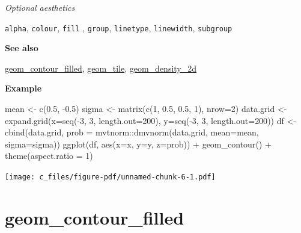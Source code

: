 \documentclass[
  letterpaper,
  DIV=11,
  numbers=noendperiod]{scrreprt}
\newenvironment{Shaded}{\begin{snugshade}}{\end{snugshade}}
\newcommand{\AttributeTok}[1]{\textcolor[rgb]{0.40,0.45,0.13}{#1}}
\newcommand{\DecValTok}[1]{\textcolor[rgb]{0.68,0.00,0.00}{#1}}
\newcommand{\FloatTok}[1]{\textcolor[rgb]{0.68,0.00,0.00}{#1}}
\newcommand{\FunctionTok}[1]{\textcolor[rgb]{0.28,0.35,0.67}{#1}}
\newcommand{\NormalTok}[1]{\textcolor[rgb]{0.00,0.23,0.31}{#1}}
\newcommand{\OtherTok}[1]{\textcolor[rgb]{0.00,0.23,0.31}{#1}}
\newcommand{\SpecialCharTok}[1]{\textcolor[rgb]{0.37,0.37,0.37}{#1}}
\begin{document}
\emph{Optional aesthetics}

\texttt{alpha}, \texttt{colour}, \texttt{fill} , \texttt{group},
\texttt{linetype}, \texttt{linewidth}, \texttt{subgroup}

\textbf{See also}

\hyperref[contour_filled]{geom\_contour\_filled},
\hyperref[tile]{geom\_tile}, \hyperref[density_2d]{geom\_density\_2d}

\textbf{Example}

\begin{Shaded}
\begin{Highlighting}[]
\NormalTok{mean }\OtherTok{\textless{}{-}} \FunctionTok{c}\NormalTok{(}\FloatTok{0.5}\NormalTok{, }\SpecialCharTok{{-}}\FloatTok{0.5}\NormalTok{)}
\NormalTok{sigma }\OtherTok{\textless{}{-}} \FunctionTok{matrix}\NormalTok{(}\FunctionTok{c}\NormalTok{(}\DecValTok{1}\NormalTok{, }\FloatTok{0.5}\NormalTok{, }\FloatTok{0.5}\NormalTok{, }\DecValTok{1}\NormalTok{), }\AttributeTok{nrow=}\DecValTok{2}\NormalTok{)}
\NormalTok{data.grid }\OtherTok{\textless{}{-}} \FunctionTok{expand.grid}\NormalTok{(}\AttributeTok{x=}\FunctionTok{seq}\NormalTok{(}\SpecialCharTok{{-}}\DecValTok{3}\NormalTok{, }\DecValTok{3}\NormalTok{, }\AttributeTok{length.out=}\DecValTok{200}\NormalTok{),}
                         \AttributeTok{y=}\FunctionTok{seq}\NormalTok{(}\SpecialCharTok{{-}}\DecValTok{3}\NormalTok{, }\DecValTok{3}\NormalTok{, }\AttributeTok{length.out=}\DecValTok{200}\NormalTok{))}
\NormalTok{df }\OtherTok{\textless{}{-}} \FunctionTok{cbind}\NormalTok{(data.grid, }\AttributeTok{prob =}\NormalTok{ mvtnorm}\SpecialCharTok{::}\FunctionTok{dmvnorm}\NormalTok{(data.grid, }\AttributeTok{mean=}\NormalTok{mean, }\AttributeTok{sigma=}\NormalTok{sigma))}
\FunctionTok{ggplot}\NormalTok{(df, }\FunctionTok{aes}\NormalTok{(}\AttributeTok{x=}\NormalTok{x, }\AttributeTok{y=}\NormalTok{y, }\AttributeTok{z=}\NormalTok{prob)) }\SpecialCharTok{+} 
  \FunctionTok{geom\_contour}\NormalTok{() }\SpecialCharTok{+} 
  \FunctionTok{theme}\NormalTok{(}\AttributeTok{aspect.ratio =} \DecValTok{1}\NormalTok{)}
\end{Highlighting}
\end{Shaded}

\texttt{[image: c\_files/figure-pdf/unnamed-chunk-6-1.pdf]}

\section{geom\_contour\_filled}\label{contour_filled}
\end{document}
